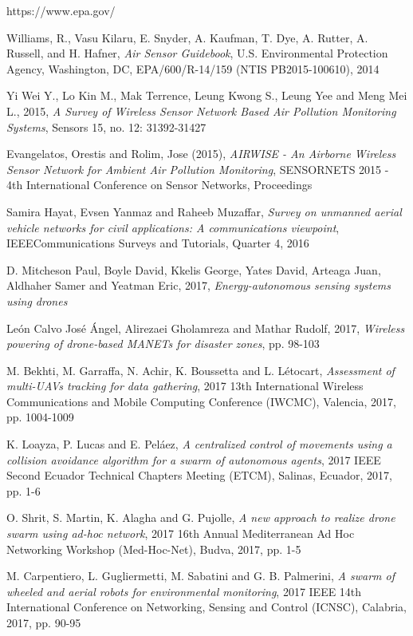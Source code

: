 \documentclass[journal]{IEEEtran}
\begin{document}
\begin{thebibliography}{1}

https://www.epa.gov/

Williams, R., Vasu Kilaru, E. Snyder, A. Kaufman, T. Dye, A. Rutter, A. Russell, and H. Hafner, \emph{Air Sensor Guidebook}, U.S. Environmental Protection Agency, Washington, DC, EPA/600/R-14/159 (NTIS PB2015-100610), 2014

Yi Wei Y., Lo Kin M., Mak Terrence, Leung Kwong S., Leung Yee and Meng Mei L., 2015, \emph{A Survey of Wireless Sensor Network Based Air Pollution Monitoring Systems}, Sensors 15, no. 12: 31392-31427

Evangelatos, Orestis and Rolim, Jose (2015), \emph{AIRWISE - An Airborne Wireless Sensor Network for Ambient Air Pollution Monitoring}, SENSORNETS 2015 - 4th International Conference on Sensor Networks, Proceedings

Samira Hayat, Evsen Yanmaz and Raheeb Muzaffar, \emph{Survey on unmanned aerial vehicle networks for civil applications: A communications viewpoint}, IEEECommunications Surveys and Tutorials, Quarter 4, 2016

D. Mitcheson Paul, Boyle David, Kkelis George, Yates David, Arteaga Juan, Aldhaher Samer and Yeatman Eric, 2017, \emph{Energy-autonomous sensing systems using drones}

León Calvo José Ángel, Alirezaei Gholamreza and Mathar Rudolf, 2017, \emph{Wireless powering of drone-based MANETs for disaster zones}, pp. 98-103

M. Bekhti, M. Garraffa, N. Achir, K. Boussetta and L. Létocart, \emph{Assessment of multi-UAVs tracking for data gathering}, 2017 13th International Wireless Communications and Mobile Computing Conference (IWCMC), Valencia, 2017, pp. 1004-1009

K. Loayza, P. Lucas and E. Peláez, \emph{A centralized control of movements using a collision avoidance algorithm for a swarm of autonomous agents}, 2017 IEEE Second Ecuador Technical Chapters Meeting (ETCM), Salinas, Ecuador, 2017, pp. 1-6

O. Shrit, S. Martin, K. Alagha and G. Pujolle, \emph{A new approach to realize drone swarm using ad-hoc network}, 2017 16th Annual Mediterranean Ad Hoc Networking Workshop (Med-Hoc-Net), Budva, 2017, pp. 1-5

M. Carpentiero, L. Gugliermetti, M. Sabatini and G. B. Palmerini, \emph{A swarm of wheeled and aerial robots for environmental monitoring}, 2017 IEEE 14th International Conference on Networking, Sensing and Control (ICNSC), Calabria, 2017, pp. 90-95
  

\end{thebibliography}
\end{document}
